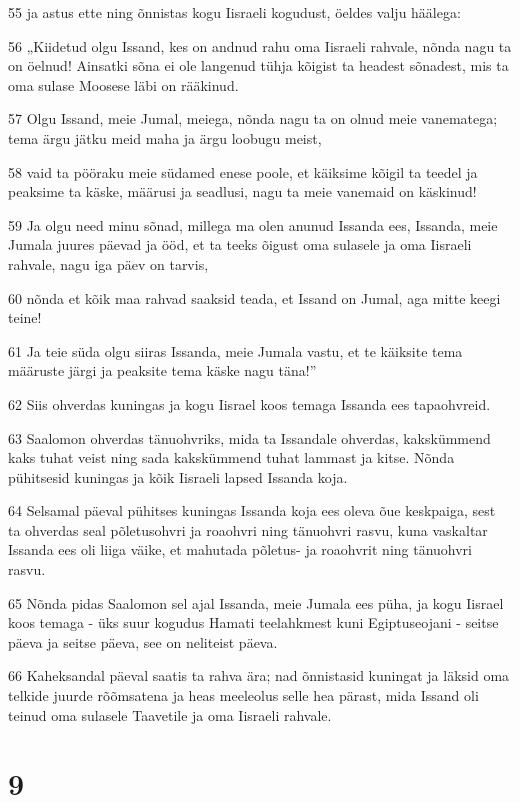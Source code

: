 \par 55 ja astus ette ning õnnistas kogu Iisraeli kogudust, öeldes valju häälega:
\par 56 „Kiidetud olgu Issand, kes on andnud rahu oma Iisraeli rahvale, nõnda nagu ta on öelnud! Ainsatki sõna ei ole langenud tühja kõigist ta headest sõnadest, mis ta oma sulase Moosese läbi on rääkinud.
\par 57 Olgu Issand, meie Jumal, meiega, nõnda nagu ta on olnud meie vanematega; tema ärgu jätku meid maha ja ärgu loobugu meist,
\par 58 vaid ta pööraku meie südamed enese poole, et käiksime kõigil ta teedel ja peaksime ta käske, määrusi ja seadlusi, nagu ta meie vanemaid on käskinud!
\par 59 Ja olgu need minu sõnad, millega ma olen anunud Issanda ees, Issanda, meie Jumala juures päevad ja ööd, et ta teeks õigust oma sulasele ja oma Iisraeli rahvale, nagu iga päev on tarvis,
\par 60 nõnda et kõik maa rahvad saaksid teada, et Issand on Jumal, aga mitte keegi teine!
\par 61 Ja teie süda olgu siiras Issanda, meie Jumala vastu, et te käiksite tema määruste järgi ja peaksite tema käske nagu täna!”
\par 62 Siis ohverdas kuningas ja kogu Iisrael koos temaga Issanda ees tapaohvreid.
\par 63 Saalomon ohverdas tänuohvriks, mida ta Issandale ohverdas, kakskümmend kaks tuhat veist ning sada kakskümmend tuhat lammast ja kitse. Nõnda pühitsesid kuningas ja kõik Iisraeli lapsed Issanda koja.
\par 64 Selsamal päeval pühitses kuningas Issanda koja ees oleva õue keskpaiga, sest ta ohverdas seal põletusohvri ja roaohvri ning tänuohvri rasvu, kuna vaskaltar Issanda ees oli liiga väike, et mahutada põletus- ja roaohvrit ning tänuohvri rasvu.
\par 65 Nõnda pidas Saalomon sel ajal Issanda, meie Jumala ees püha, ja kogu Iisrael koos temaga - üks suur kogudus Hamati teelahkmest kuni Egiptuseojani - seitse päeva ja seitse päeva, see on neliteist päeva.
\par 66 Kaheksandal päeval saatis ta rahva ära; nad õnnistasid kuningat ja läksid oma telkide juurde rõõmsatena ja heas meeleolus selle hea pärast, mida Issand oli teinud oma sulasele Taavetile ja oma Iisraeli rahvale.

\chapter{9}

